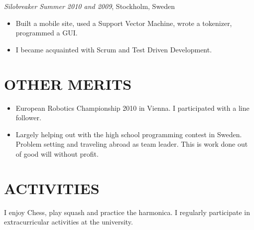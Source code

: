 \documentclass[11pt]{res} %
\begin{document}
\begin{resume}
\emph{Silobreaker Summer 2010 and 2009}, Stockholm, Sweden
\vspace{0.2in}
 \begin{itemize} %
  \item Built a mobile site, used a Support Vector Machine, wrote a tokenizer,
   programmed a GUI.
  \item I became acquainted with Scrum and Test Driven Development.
\end{itemize} 

\section{OTHER MERITS}

   \begin{itemize} %
   \item European Robotics Championship 2010 in Vienna.
    I participated with a line follower.
   \item Largely helping out with the high school programming contest in Sweden.
    Problem setting and traveling abroad as team leader.
    This is work done out of good will without profit.
 \end{itemize}

\section{ACTIVITIES} 
 
I enjoy Chess, play squash and practice the harmonica.
I regularly participate in extracurricular
activities at the university.
 

\end{resume}
\end{document}

